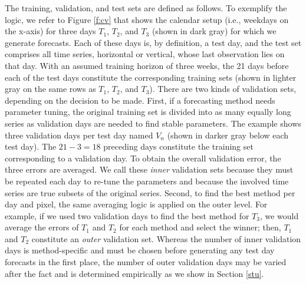 The training, validation, and test sets are defined as follows.
To exemplify the logic, we refer to Figure \ref{f:cv} that shows the calendar
    setup (i.e., weekdays on the x-axis) for three days $T_1$, $T_2$, and
    $T_3$ (shown in dark gray) for which we generate forecasts.
Each of these days is, by definition, a test day, and the test set comprises
    all time series, horizontal or vertical, whose last observation lies on
    that day.
With an assumed training horizon of three weeks, the 21 days before each of
    the test days constitute the corresponding training sets (shown in lighter
    gray on the same rows as $T_1$, $T_2$, and $T_3$).
There are two kinds of validation sets, depending on the decision to be made.
First, if a forecasting method needs parameter tuning, the original training
    set is divided into as many equally long series as validation days are
    needed to find stable parameters.
The example shows three validation days per test day named $V_n$ (shown
    in darker gray below each test day).
The $21 - 3 = 18$ preceding days constitute the training set corresponding to
    a validation day.
To obtain the overall validation error, the three errors are averaged.
We call these \textit{inner} validation sets because they must be repeated
    each day to re-tune the parameters and because the involved time series
    are true subsets of the original series.
Second, to find the best method per day and pixel, the same averaging logic
    is applied on the outer level.
For example, if we used two validation days to find the best method for $T_3$,
    we would average the errors of $T_1$ and $T_2$ for each method and select
    the winner; then, $T_1$ and $T_2$ constitute an \textit{outer} validation
    set.
Whereas the number of inner validation days is method-specific and must be
    chosen before generating any test day forecasts in the first place, the
    number of outer validation days may be varied after the fact and is
    determined empirically as we show in Section \ref{stu}.

